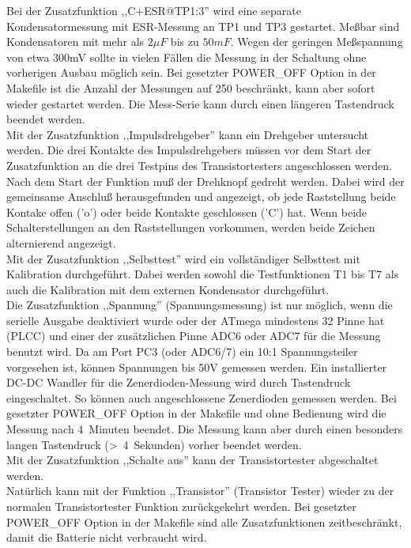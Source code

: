 Bei der Zusatzfunktion ,,C+ESR@TP1:3'' wird eine separate Kondensatormessung mit ESR-Messung an TP1 und TP3 gestartet.
Meßbar sind Kondensatoren mit mehr als \(2 \mu F\) bis zu \(50 mF\). Wegen der geringen Meßspannung von etwa 300mV sollte
in vielen Fällen die Messung in der Schaltung ohne vorherigen Ausbau möglich sein.
Bei gesetzter POWER\_OFF Option in der Makefile ist die Anzahl der Messungen auf 250 beschränkt,
kann aber sofort wieder gestartet werden.
Die Mess-Serie kann durch einen längeren Tastendruck  beendet werden.\\

Mit der Zusatzfunktion ,,Impulsdrehgeber'' kann ein Drehgeber untersucht werden.
Die drei Kontakte des Impulsdrehgebers müssen vor dem Start der Zusatzfunktion an die drei Testpins
 des Transistortesters angeschlossen werden.
Nach dem Start der Funktion muß der Drehknopf gedreht werden.
Dabei wird der gemeinsame Anschluß herausgefunden und angezeigt, ob jede Raststellung beide Kontake offen ('o')
oder beide Kontakte geschlossen ('C') hat.
Wenn beide Schalterstellungen an den Raststellungen vorkommen,
werden beide Zeichen alternierend angezeigt.\\

Mit der Zusatzfunktion ,,Selbsttest'' wird ein vollständiger Selbsttest mit Kalibration durchgeführt.
Dabei werden sowohl die Testfunktionen T1 bis T7 als auch die Kalibration mit dem externen Kondensator
durchgeführt.\\

Die Zusatzfunktion ,,Spannung'' (Spannungsmessung) ist nur möglich, wenn die serielle Ausgabe deaktiviert wurde
oder der ATmega mindestens 32 Pinne hat (PLCC) und einer der zusätzlichen Pinne ADC6 oder ADC7 für die Messung benutzt wird.
Da am Port PC3 (oder ADC6/7) ein 10:1 Spannungsteiler vorgesehen ist, können Spannungen bis 50V gemessen werden.
Ein installierter DC-DC Wandler für die Zenerdioden-Messung wird durch Tastendruck eingeschaltet.
So können auch angeschlossene Zenerdioden gemessen werden.
Bei gesetzter POWER\_OFF Option in der Makefile und ohne Bedienung wird die Messung nach 4~Minuten beendet.
Die Messung kann aber durch einen besonders langen Tastendruck (\textgreater~4~Sekunden) vorher beendet werden.\\

Mit der Zusatzfunktion ,,Schalte aus'' kann der Transistortester abgeschaltet werden.\\

Natürlich kann mit der Funktion ,,Transistor'' (Transistor Tester) wieder zu der normalen Transistortester Funktion
zurückgekehrt werden.
Bei gesetzter POWER\_OFF Option in der Makefile sind alle Zusatzfunktionen zeitbeschränkt, damit die Batterie nicht verbraucht wird.

